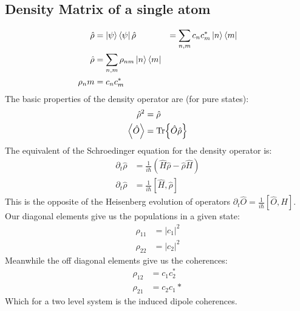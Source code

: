 \subsection{Density Matrix of a single atom}
\begin{align*}
	\hat{\rho} &= \ket{\psi}\bra{\psi}
	\hat{\rho} &= \sum_{n,m} c_n c_m ^* \ket{n}\bra{m} \\
	\hat{\rho} &= \sum_{n,m} \rho_{nm} \ket{n}\bra{m} \\
	\rho_nm &= c_n c_m^*
\end{align*}
The basic properties of the density operator are (for pure states):
\begin{align*}
	\hat{\rho}^2 &= \hat{\rho} \\
	\expval{\hat{O}} &= \Tr{\hat{O}\hat{\rho}}
\end{align*}
The equivalent of the Schroedinger equation for the density operator is:
\begin{align*}
	\partial_t \hat{\rho} &= \frac{1}{i\hbar} \left(\hat{H}\hat{\rho} - \hat{\rho}\hat{H}\right) \\
	\partial_t \hat{\rho} &= \frac{1}{i\hbar} [\hat{H},\hat{\rho}]
\end{align*}
This is the opposite of the Heisenberg evolution of operators $\partial_t \hat{O} = \frac{1}{i\hbar} [\hat{O},\hat{H}]$. Our diagonal elements give us the populations in a given state:
\begin{align*}
	\rho_{11} &= |c_1|^2 \\
	\rho_{22} &= |c_2|^2
\end{align*}
Meanwhile the off diagonal elements give us the coherences:
\begin{align*}
	\rho_{12} &= c_1 c_2^* \\
	\rho_{21} &= c_2 c_1*
\end{align*}
Which for a two level system is the induced dipole coherences.
